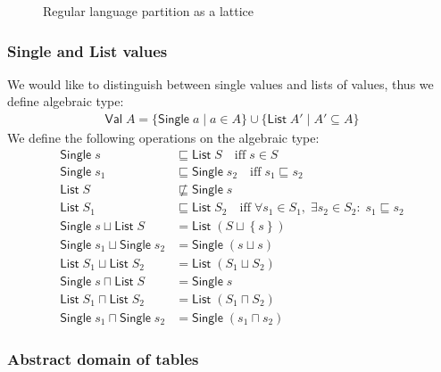 \begin{figure}[!htb]
    \center
    
    \caption{Regular language partition as a lattice}
    \label{fig:tikz-reg-partition-lattice}
\end{figure}

\subsubsection{Single and List values}

We would like to distinguish between single values and lists of values, thus we define algebraic type:
\begin{align}
    \mathsf{Val} \; A = \{ \mathsf{Single} \; a \mid a \in A \} \cup \{ \mathsf{List} \; A' \mid A' \subseteq A \}
\end{align}
We define the following operations on the algebraic type:
\begin{align}
    \mathsf{Single} \; s &\sqsubseteq \mathsf{List} \; S \quad
    \text{iff} \; s \in S \\
    \mathsf{Single} \; s_1 &\sqsubseteq \mathsf{Single} \; s_2 \quad
    \text{iff} \; s_1 \sqsubseteq s_2 \\
    \mathsf{List} \; S &\not\sqsubseteq \mathsf{Single} \; s\\
    \mathsf{List} \; S_1 &\sqsubseteq \mathsf{List} \; S_2 \quad
    \text{iff} \; \forall s_1 \in S_1, \; \exists s_2 \in S_2: \; s_1 \sqsubseteq s_2\\
    \mathsf{Single} \; s \sqcup \mathsf{List} \; S &= \mathsf{List} \; (S\sqcup\left\{ s \right\})\\
    \mathsf{Single} \; s_1 \sqcup \mathsf{Single} \; s_2 &= \mathsf{Single} \; (s \sqcup s )\\
    \mathsf{List} \; S_1 \sqcup \mathsf{List} \; S_2 &= \mathsf{List} \; (S_1 \sqcup S_2)\\
    \mathsf{Single} \; s \sqcap \mathsf{List} \; S &= \mathsf{Single} \; s\\
    \mathsf{List} \; S_1 \sqcap \mathsf{List} \; S_2 &= \mathsf{List} \; (S_1 \sqcap S_2)\\
    \mathsf{Single} \; s_1 \sqcap \mathsf{Single} \; s_2 &= \mathsf{Single} \; (s_1 \sqcap s_2)
\end{align}

\subsubsection{Abstract domain of tables}\label{subsubsec:abstract_domain_of_tables}


